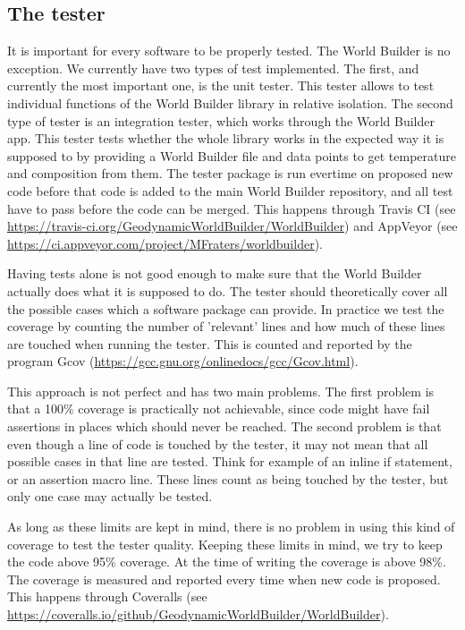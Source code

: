 \documentclass{book}
\newcommand{\WB}{{World Builder}}
\newcommand{\gcov}{{Gcov}}
\begin{document}
\subsection{The tester}

It is important for every software to be properly tested. The \WB{} is no exception. We currently have two types of test implemented. The first, and currently the most important one, is the unit tester. This tester allows to test individual functions of the \WB{} library in relative isolation. The second type of tester is an integration tester, which works through the \WB{} app. This tester tests whether the whole library works in the expected way it is supposed to by providing a \WB{} file and data points to get temperature and composition from them. The tester package is run evertime on proposed new code before that code is added to the main \WB{} repository, and all test have to pass before the code can be merged. This happens through Travis CI (see \url{https://travis-ci.org/GeodynamicWorldBuilder/WorldBuilder}) and AppVeyor (see \url{https://ci.appveyor.com/project/MFraters/worldbuilder}).

Having tests alone is not good enough to make sure that the \WB{} actually does what it is supposed to do. The tester should theoretically cover all the possible cases which a software package can provide. In practice we test the coverage by counting the number of 'relevant' lines and how much of these lines are touched when running the tester. This is counted and reported by the program \gcov{} (\url{https://gcc.gnu.org/onlinedocs/gcc/Gcov.html}).

This approach is not perfect and has two main problems. The first problem is that a 100\% coverage is practically not achievable, since code might have fail assertions in places which should never be reached. The second problem is that even though a line of code is touched by the tester, it may not mean that all possible cases in that line are tested. Think for example of an inline if statement, or an assertion macro line. These lines count as being touched by the tester, but only one case may actually be tested.

As long as these limits are kept in mind, there is no problem in using this kind of coverage to test the tester quality. Keeping these limits in mind, we try to keep the code above 95\% coverage. At the time of writing the coverage is above 98\%. The coverage is measured and reported every time when new code is proposed. This happens through Coveralls (see \url{https://coveralls.io/github/GeodynamicWorldBuilder/WorldBuilder}).
\end{document}
